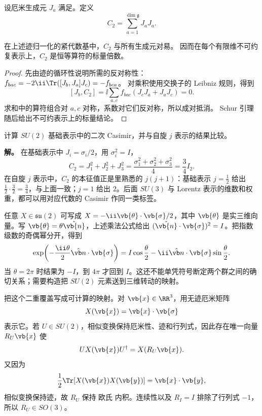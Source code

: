 \begin{definition}[二次 Casimir 算符]\label{def:casimir}
设厄米生成元 $J_a$ 满足。定义
\begin{equation}
C_2=\sum_{a=1}^{\dim\mathfrak g}J_aJ_a.
\label{eq:casimir-def}
\end{equation}
\end{definition}

\begin{proposition}
在上述迹归一化的紧代数基中，$C_2$ 与所有生成元对易。
因而在每个有限维不可约复表示上，$C_2$ 是恒等算符的标量倍数。
\end{proposition}

\begin{proof}
先由迹的循环性说明所需的反对称性：
$f_{bac}=-2\ii\Tr([J_b,J_a]J_c)=-f_{bca}$。
对乘积使用交换子的 Leibniz 规则，得到
\[
[J_b,C_2]=\ii\sum_{a,c}f_{bac}(J_cJ_a+J_aJ_c)=0.
\]
求和中的算符组合对 $a,c$ 对称，系数对它们反对称，所以成对抵消。
Schur 引理随后给出不可约表示上的标量结论。
\end{proof}

\begin{example}[SU(2) 的 Casimir]
计算 $SU(2)$ 基础表示中的二次 Casimir，并与自旋 $j$ 表示的结果比较。

\textbf{解。} 在基础表示中 $J_i=\sigma_i/2$，用 $\sigma_i^2=I$，
\[
C_2=J_1^2+J_2^2+J_3^2=\frac{\sigma_1^2+\sigma_2^2+\sigma_3^2}{4}=\frac{3}{4}I_2.
\]
在自旋 $j$ 表示中，$C_2$ 的本征值正是里熟悉的 $j(j+1)$：基础表示 $j=\tfrac12$ 给出 $\tfrac12\cdot\tfrac32=\tfrac34$，与上面一致；$j=1$ 给出 $2$。后面 $SU(3)$ 与 Lorentz 表示的维数和权重，都可以用对应代数的 Casimir 作同一类标签。
\end{example}

任意 $X\in\mathfrak{su}(2)$ 可写成 $X=-\ii\vb{\theta}\cdot\vb{\sigma}/2$，其中 $\vb{\theta}$ 是实三维向量。写 $\vb{\theta}=\theta\hat{\vb{n}}$，上述乘法公式给出 $(\hat{\vb{n}}\cdot\vb{\sigma})^2=I$。把指数级数的奇偶幂分开，得到
\begin{equation}
\exp\!\left(-\frac{\ii\theta}{2}\hat{\vb n}\cdot\vb{\sigma}\right)
=I\cos\frac\theta2-\ii\hat{\vb n}\cdot\vb{\sigma}\sin\frac\theta2.
\label{eq:su2-axis-angle-exp}
\end{equation}
当 $\theta=2\pi$ 时结果为 $-I$，到 $4\pi$ 才回到 $I$。这还不能单凭符号断定两个群之间的确切关系；需要构造把 $SU(2)$ 元素送到三维转动的映射。

把这个二重覆盖写成可计算的映射。对 $\vb{x}\in\RR^3$，用无迹厄米矩阵
\[
X(\vb{x})=\vb{x}\cdot\vb{\sigma}
\]
表示它。若 $U\in SU(2)$，相似变换保持厄米性、迹和行列式，因此存在唯一向量 $R_U\vb{x}$ 使
\begin{equation}
U X(\vb{x})U^\dagger=X(R_U\vb{x}).
\label{eq:su2-so3-conjugation}
\end{equation}
又因为
\[
\frac12\Tr[X(\vb{x})X(\vb{y})]
=\vb{x}\cdot\vb{y},
\]
相似变换保持迹，故 $R_U$ 保持 欧氏 内积。连续性以及 $R_I=I$ 排除了行列式 $-1$，所以 $R_U\in SO(3)$。

